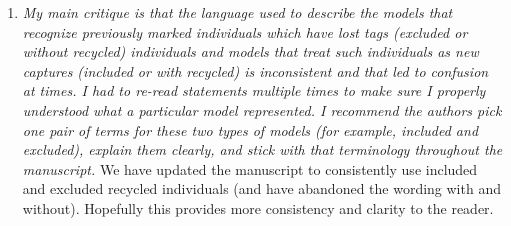 \documentclass[12pt]{article}
\begin{document}
\begin{enumerate}
\item  {\it My main critique is that the language used to describe the models that recognize previously marked individuals which have lost tags (excluded or without recycled) individuals and models that treat such individuals as new captures (included or with recycled) is inconsistent and that led to confusion at times. I had to re-read statements multiple times to make sure I properly understood what a particular model represented. I recommend the authors pick one pair of terms for these two types of models (for example, included and excluded), explain them clearly, and stick with that terminology throughout the manuscript.}
We have updated the manuscript to consistently use included and excluded recycled individuals (and have abandoned the wording with and without). Hopefully this provides more consistency and clarity to the reader.
\end{enumerate}


\bigskip
\end{document}
